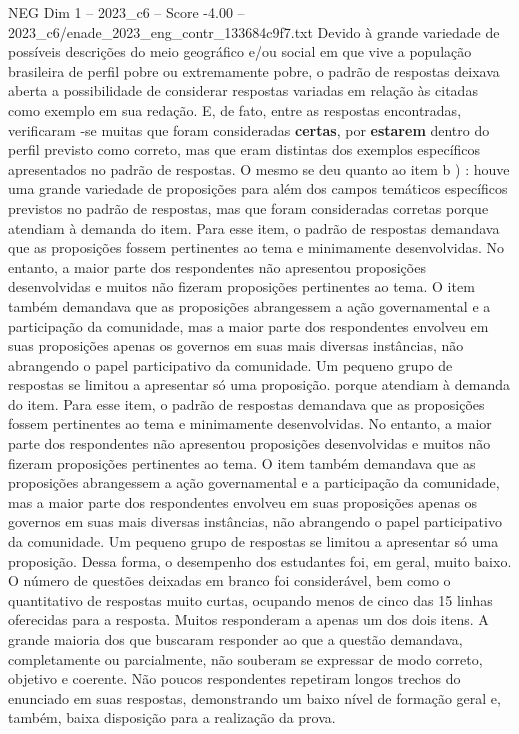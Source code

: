 \begin{textsample}{NEG Dim 1 – 2023\_c6 – Score -4.00 – 2023\_c6/enade\_2023\_eng\_contr\_133684c9f7.txt}
Devido à grande variedade de possíveis descrições do meio geográfico e/ou social em que vive a população brasileira de perfil pobre ou extremamente pobre, o padrão de respostas deixava aberta a possibilidade de considerar respostas variadas em relação às citadas como exemplo em sua redação.
E, de fato, entre as respostas encontradas, verificaram -se muitas que foram consideradas \textbf{certas}, por \textbf{estarem} dentro do perfil previsto como correto, mas que eram distintas dos exemplos específicos apresentados no padrão de respostas.
O mesmo se deu quanto ao item b ) : houve uma grande variedade de proposições para além dos campos temáticos específicos previstos no padrão de respostas, mas que foram consideradas corretas porque atendiam à demanda do item.
Para esse item, o padrão de respostas demandava que as proposições fossem pertinentes ao tema e minimamente desenvolvidas.
No entanto, a maior parte dos respondentes não apresentou proposições desenvolvidas e muitos não fizeram proposições pertinentes ao tema.
O item também demandava que as proposições abrangessem a ação governamental e a participação da comunidade, mas a maior parte dos respondentes envolveu em suas proposições apenas os governos em suas mais diversas instâncias, não abrangendo o papel participativo da comunidade.
Um pequeno grupo de respostas se limitou a apresentar só uma proposição. porque atendiam à demanda do item.
Para esse item, o padrão de respostas demandava que as proposições fossem pertinentes ao tema e minimamente desenvolvidas.
No entanto, a maior parte dos respondentes não apresentou proposições desenvolvidas e muitos não fizeram proposições pertinentes ao tema.
O item também demandava que as proposições abrangessem a ação governamental e a participação da comunidade, mas a maior parte dos respondentes envolveu em suas proposições apenas os governos em suas mais diversas instâncias, não abrangendo o papel participativo da comunidade.
Um pequeno grupo de respostas se limitou a apresentar só uma proposição.
Dessa forma, o desempenho dos estudantes foi, em geral, muito baixo.
O número de questões deixadas em branco foi considerável, bem como o quantitativo de respostas muito curtas, ocupando menos de cinco das 15 linhas oferecidas para a resposta.
Muitos responderam a apenas um dos dois itens.
A grande maioria dos que buscaram responder ao que a questão demandava, completamente ou parcialmente, não souberam se expressar de modo correto, objetivo e coerente.
Não poucos respondentes repetiram longos trechos do enunciado em suas respostas, demonstrando um baixo nível de formação geral e, também, baixa disposição para a realização da prova.

\end{textsample}
